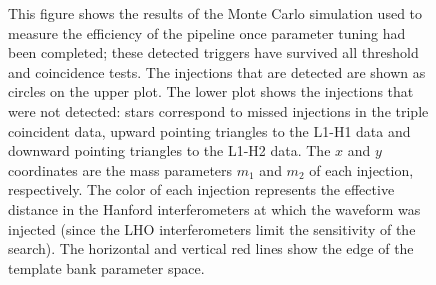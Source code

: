 \begin{figure}[p]
{\label{f:m1m2_found_missed}%
This figure shows the results of the Monte Carlo simulation used to measure
the efficiency of the pipeline once parameter tuning had been completed; these
detected triggers have survived all threshold and coincidence tests.  The
injections that are detected are shown as circles on the upper plot.  The
lower plot shows the injections that were not detected: stars correspond to
missed injections in the triple coincident data, upward pointing triangles to
the L1-H1 data and downward pointing triangles to the L1-H2 data. The $x$ and
$y$ coordinates are the mass parameters $m_1$ and $m_2$ of each injection,
respectively. The color of each injection represents the effective distance in
the Hanford interferometers at which the waveform was injected (since the LHO
interferometers limit the sensitivity of the search).  The horizontal and
vertical red lines show the edge of the template bank parameter space. 
}
\end{figure}

